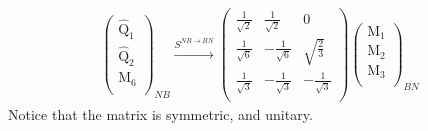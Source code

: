 \documentclass[12pt,a4paper]{article}
\newcounter{arrow}
\begin{document}
\begin{align}
\left( \begin{matrix}
\widehat{\text{Q}}_1\\
\widehat{\text{Q}}_2\\
\text{M}_6\\
\end{matrix} \right)_{NB}
\xrightarrow{S^{NB \rightarrow BN}}
\left( \begin{matrix}
\frac{1}{\sqrt{2}}& \frac{1}{\sqrt{2}}& 0 \\
\frac{1}{\sqrt{6}} & - \frac{1}{\sqrt{6}} & \sqrt{\frac{2}{3}} \\
\frac{1}{\sqrt{3}} & - \frac{1}{\sqrt{3}} & - \frac{1}{\sqrt{3}} \\
\end{matrix} \right)
\left( \begin{matrix}
\text{M}_1\\
\text{M}_2\\
\text{M}_3\\
\end{matrix} \right)_{BN}
\end{align}
Notice that the matrix is symmetric, and unitary.
\end{document}
